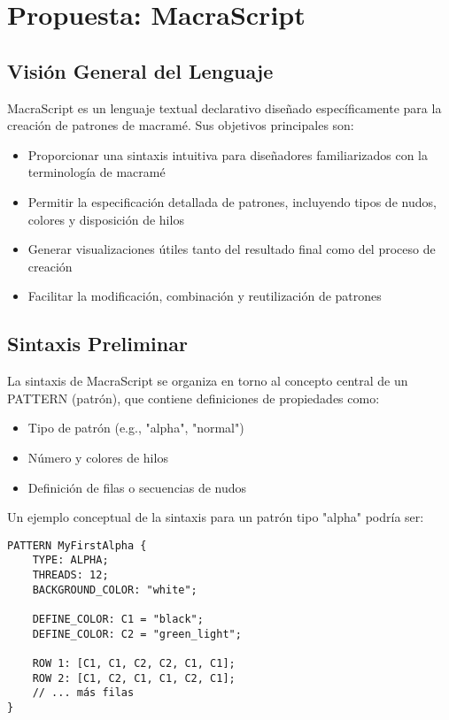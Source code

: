 \documentclass[conference]{IEEEtran}
\begin{document}
\section{Propuesta: MacraScript}
\subsection{Visión General del Lenguaje}
MacraScript es un lenguaje textual declarativo diseñado específicamente para la creación de patrones de macramé. Sus objetivos principales son:

\begin{itemize}
    \item Proporcionar una sintaxis intuitiva para diseñadores familiarizados con la terminología de macramé
    \item Permitir la especificación detallada de patrones, incluyendo tipos de nudos, colores y disposición de hilos
    \item Generar visualizaciones útiles tanto del resultado final como del proceso de creación
    \item Facilitar la modificación, combinación y reutilización de patrones
\end{itemize}

\subsection{Sintaxis Preliminar}
La sintaxis de MacraScript se organiza en torno al concepto central de un PATTERN (patrón), que contiene definiciones de propiedades como:

\begin{itemize}
    \item Tipo de patrón (e.g., "alpha", "normal")
    \item Número y colores de hilos
    \item Definición de filas o secuencias de nudos
\end{itemize}

Un ejemplo conceptual de la sintaxis para un patrón tipo "alpha" podría ser:

\begin{verbatim}
PATTERN MyFirstAlpha {
    TYPE: ALPHA;
    THREADS: 12;
    BACKGROUND_COLOR: "white";

    DEFINE_COLOR: C1 = "black";
    DEFINE_COLOR: C2 = "green_light";
    
    ROW 1: [C1, C1, C2, C2, C1, C1];
    ROW 2: [C1, C2, C1, C1, C2, C1];
    // ... más filas
}
\end{verbatim}
\end{document}
